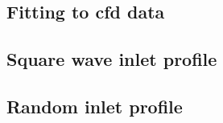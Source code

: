 

\subsection{Fitting to \gls{cfd} data}



\subsection{Square wave inlet profile}



\subsection{Random inlet profile}